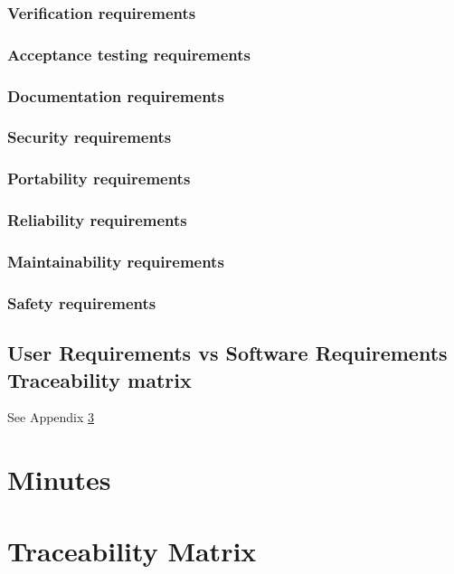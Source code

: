   \subsection{Verification requirements}
    \label{sec:verification_requirements}
    
  \subsection{Acceptance testing requirements}
    \label{sec:acceptance_testing_requirements}
    
  \subsection{Documentation requirements}
    \label{sec:documentation_requirements}
    
  \subsection{Security requirements}
    \label{sec:security_requirements}
    
  \subsection{Portability requirements}
    \label{sec:portability_requirements}
    
  \subsection{Reliability requirements}
    \label{sec:reliability_requirements}
    
  \subsection{Maintainability requirements}
    \label{sec:maintainability_requirements}
    
  \subsection{Safety requirements}
    \label{sec:safety_requirements}
    

\section{User Requirements vs Software Requirements Traceability matrix}
	See Appendix \ref{chap:matrix}
\appendix

\chapter{Minutes}
	
\chapter{Traceability Matrix}
\label{chap:matrix}


